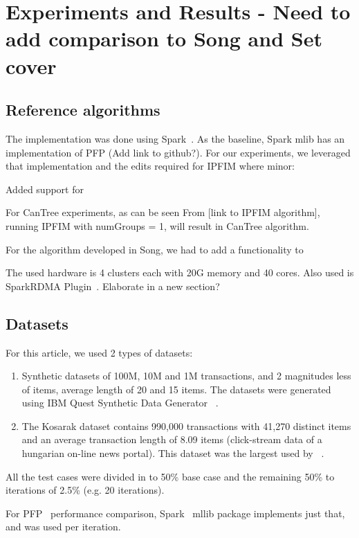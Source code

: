 \section{Experiments and Results - Need to add comparison to Song and Set cover}

\subsection{Reference algorithms}
The implementation was done using Spark~\cite{spark}. As the baseline, Spark mlib has an implementation of PFP (Add link to github?). For our experiments, we leveraged that implementation and the edits required for IPFIM where minor:
\begin{steps}
\item Added support for 
\end{steps}
For CanTree experiments, as can be seen From [link to IPFIM algorithm], running IPFIM with numGroups = 1, will result in CanTree algorithm.

For the algorithm developed in Song, we had to add a functionality to

The used hardware is 4 clusters each with 20G memory and 40 cores. Also used is SparkRDMA Plugin~\cite{SparkRDMA}.  Elaborate in a new section?

\subsection{Datasets}
For this article, we used 2 types of datasets:
\begin{enumerate}
\item Synthetic datasets of 100M, 10M and 1M transactions, and 2 magnitudes less of items, average length of 20 and 15 items. The datasets were generated using IBM Quest Synthetic Data Generator ~\cite{agrawal1994quest}. 
\item The Kosarak dataset contains 990,000 transactions with 41,270 distinct items and an average transaction length of 8.09 items (click-stream data of a hungarian on-line news portal). This dataset was the largest used by ~\cite{tanbeer2009efficient}.
\end{enumerate}


All the test cases were divided in to 50\% base case and the remaining 50\% to iterations of 2.5\% (e.g. 20 iterations).


For PFP~\cite{li2008pfp} performance comparison, Spark~\cite{spark} mllib package implements just that, and was used per iteration.


